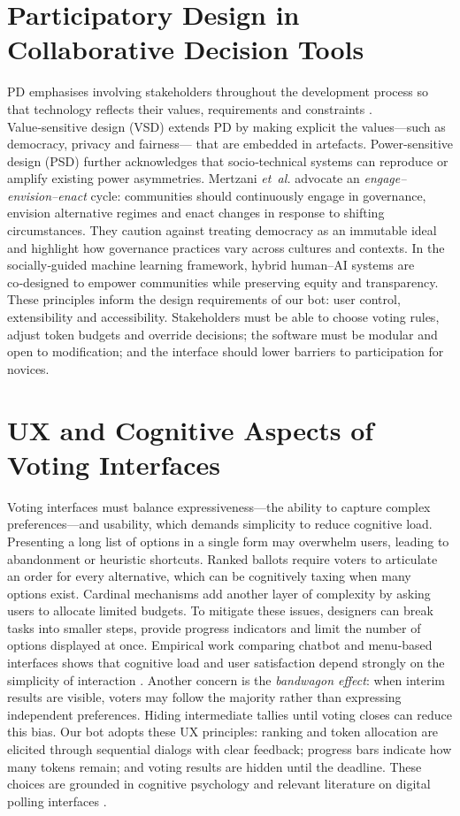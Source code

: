 \section{Participatory Design in Collaborative Decision Tools}

PD emphasises involving stakeholders throughout
    the development process so that technology reflects their values,
requirements and constraints \cite{Schuler1993,Schneider2018}.  Value‑sensitive design (VSD) extends PD
by making explicit the values—such as democracy, privacy and fairness—
that are embedded in artefacts.  Power‑sensitive design (PSD) further
acknowledges that socio‑technical systems can reproduce or amplify
existing power asymmetries.  Mertzani \emph{et~al.} advocate an
\emph{engage–envision–enact} cycle: communities should continuously
engage in governance, envision alternative regimes and enact changes
in response to shifting circumstances.  They caution against treating
democracy as an immutable ideal and highlight how governance practices
vary across cultures and contexts.  In the socially‑guided machine
learning framework, hybrid human–AI systems are co‑designed to empower
communities while preserving equity and transparency.  These principles
inform the design requirements of our bot: user control, extensibility
and accessibility.  Stakeholders must be able to choose voting rules,
adjust token budgets and override decisions; the software must be
modular and open to modification; and the interface should lower
barriers to participation for novices.

\section{UX and Cognitive Aspects of Voting Interfaces}

Voting interfaces must balance expressiveness—the ability to capture
complex preferences—and usability, which demands simplicity to reduce
cognitive load.  Presenting a long list of options in a single form may
overwhelm users, leading to abandonment or heuristic shortcuts.  Ranked
ballots require voters to articulate an order for every alternative,
which can be cognitively taxing when many options exist.  Cardinal mechanisms add another layer of complexity by asking users to allocate
limited budgets.  To mitigate these issues, designers can break tasks
into smaller steps, provide progress indicators and limit the number of
options displayed at once.  Empirical work comparing chatbot and menu‑based
interfaces shows that cognitive load and user satisfaction depend strongly on the simplicity of interaction \cite{Nguyen2022}.  Another concern is the \emph{bandwagon
effect}: when interim results are visible, voters may follow the
majority rather than expressing independent preferences.  Hiding
intermediate tallies until voting closes can reduce this bias.  Our
bot adopts these UX principles: ranking and token allocation are
elicited through sequential dialogs with clear feedback; progress bars
indicate how many tokens remain; and voting results are hidden until
the deadline.  These choices are grounded in cognitive psychology and
relevant literature on digital polling interfaces \cite{[ADD CITATION for cognitive psychology in digital polling interfaces]}.

